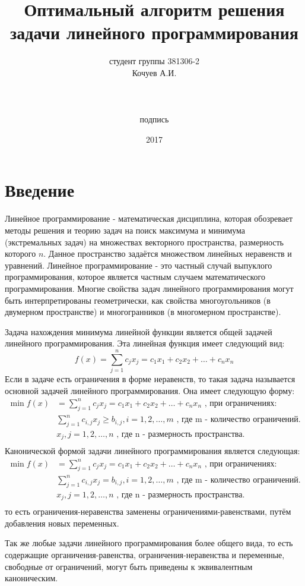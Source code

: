 \documentclass[12pt,a4paper]{article}
\title{Оптимальный алгоритм решения задачи линейного программирования}
\author{студент группы 381306-2 \\ Кочуев А.И.\\ \noindent\rule{5cm}{0.4pt} \\ подпись\\}
\date{2017}
\begin{document}
\maketitle

\tableofcontents

\newpage


\section*{Введение}


Линейное программирование - математическая дисциплина, которая обозревает методы решения и теорию задач на поиск максимума и минимума (экстремальных задач) на множествах векторного пространства, размерность которого $n$. Данное пространство задаётся множеством линейных неравенств и уравнений. Линейное программирование - это частный случай выпуклого программирования, которое является частным случаем математического программирования. Многие свойства задач линейного программирования могут быть интерпретированы геометрически, как свойства многоугольников (в двумерном пространстве) и многогранников (в многомерном пространстве).\par
Задача нахождения минимума линейной функции является общей задачей линейного программирования. Эта линейная функция имеет следующий вид:
\[
f(x)=
\sum_{j=1}^n c_{j}x_{j}
= c_{1}x_{1}+c_{2}x_{2}+\dots+c_{n}x_{n}
\]
Если в задаче есть ограничения в форме неравенств, то такая задача называется основной задачей линейного программирования. Она имеет следующую форму:
\[
\begin{aligned}
\min f(x)&=
\sum_{j=1}^n c_{j}x_{j}
= c_{1}x_{1}+c_{2}x_{2}+\dots+c_{n}x_{n} \text{ , при ограничениях:}\\
&\sum_{j=1}^n c_{i,j}x_{j}\geqslant b_{i,j}, i=1,2,\dots,m \text{ , где m - количество ограничений.}\\
&x_{j}, j=1,2,\dots,n \text{ , где n - размерность пространства.}\\
\end{aligned}
\]
Канонической формой задачи линейного программирования является следующая:
\[
\begin{aligned}
\min f(x)&=
\sum_{j=1}^n c_{j}x_{j}
= c_{1}x_{1}+c_{2}x_{2}+\dots+c_{n}x_{n} \text{ , при ограничениях:}\\
&\sum_{j=1}^n c_{i,j}x_{j}= b_{i,j}, i=1,2,\dots,m \text{ , где m - количество ограничений.}\\
&x_{j}, j=1,2,\dots,n \text{ , где n - размерность пространства.}\\
\end{aligned}
\]
то есть ограничения-неравенства заменены ограничениями-равенствами, путём добавления новых переменных.\par
Так же любые задачи линейного программирования более общего вида, то есть содержащие органичения-равенства, ограничения-неравенства и переменные, свободные от ограничений, могут быть приведены к эквивалентным каноническим.\par
\end{document}

